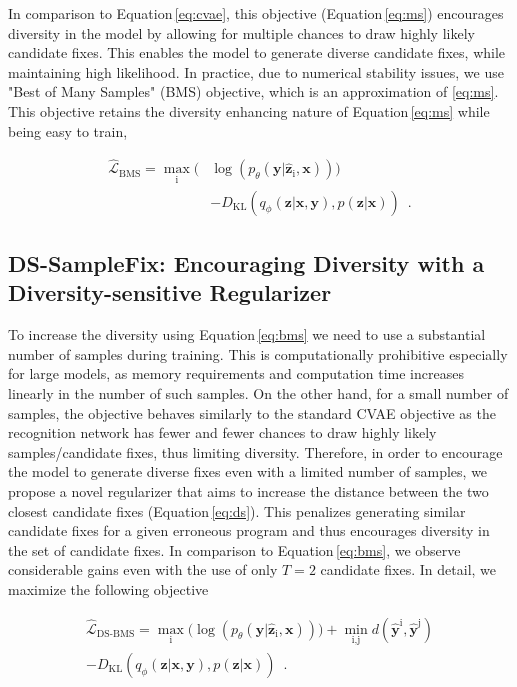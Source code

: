 \documentclass[runningheads]{llncs}
\newcommand{\dssmaplefix}{DS-SampleFix}
\newcommand{\equref}{Equation}
\begin{document}
In comparison to \equref \,\ref{eq:cvae}, this objective (\equref \,\ref{eq:ms}) encourages diversity in the model by allowing for multiple chances to draw highly likely candidate fixes. This enables the model to generate diverse candidate fixes, while maintaining high likelihood. In practice, due to numerical stability issues, 
we use "Best of Many Samples" (BMS) objective, which is an approximation of \ref{eq:ms}. This objective retains the diversity enhancing nature of \equref \,\ref{eq:ms} while being easy to train,

\begin{equation}\label{eq:bms}\tag{4}
    \begin{aligned}
    \hat{\mathcal{L}}_{\text{BMS}} = \max_{\text{i}} \big( &\log( p_{\theta}(\textbf{y} | \hat{\textbf{z}}_{\text{i}}, \textbf{x}) )  \big) 
    \\&- D_\text{KL}({q_{\phi}(\textbf{z} | \textbf{x}, \textbf{y})},{p(\textbf{z} | \textbf{x})})\enspace{.}
    \end{aligned}
\end{equation}

\subsection{\dssmaplefix: Encouraging Diversity with a Diversity-sensitive Regularizer}
\label{subsec:ds}
To increase the diversity using \equref \,\ref{eq:bms} we need to use a substantial number  of samples  during training. This is computationally prohibitive especially for large models, as memory requirements and computation time increases linearly in the number of such samples. On the other hand, for a small number of samples, the objective behaves similarly to the standard CVAE objective as the recognition network has fewer and fewer chances to draw highly likely samples/candidate fixes, thus limiting diversity. Therefore, in order to encourage the model to generate diverse fixes even with a limited number of samples, 
we propose a novel regularizer that aims to increase the distance between the two closest candidate fixes  (\equref \,\ref{eq:ds}). This
penalizes generating similar candidate fixes for a given erroneous program and thus encourages diversity in the set of candidate fixes. In comparison to \equref \,\ref{eq:bms}, we observe considerable gains even with the use of only $T=2$ candidate fixes. In detail, we maximize the following objective

\begin{equation}\label{eq:ds}\tag{5}
\begin{aligned}
    \hat{\mathcal{L}}_{\text{DS-BMS}} = \max_{\text{i}} \big( \log( p_{\theta}(\textbf{y} | \hat{\textbf{z}}_{\text{i}}, \textbf{x}) )  \big) 
    + \min_{\text{i},\text{j}} d(\hat{\textbf{y}}^{\text{i}},\hat{\textbf{y}}^{\text{j}}) \nonumber \\
    - D_\text{KL}({q_{\phi}(\textbf{z} | \textbf{x}, \textbf{y})},{p(\textbf{z} | \textbf{x})})\enspace{.}
\end{aligned}
\end{equation}
\end{document}
